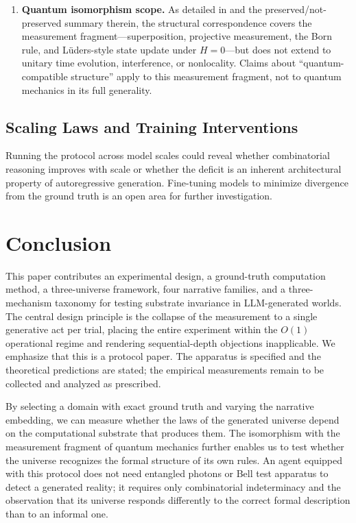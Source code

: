 \documentclass[12pt,a4paper]{article}
\begin{document}
\begin{enumerate}[nosep]
    \item \textbf{Quantum isomorphism scope.} As detailed in  and the preserved/not-preserved summary therein, the structural correspondence covers the measurement fragment---superposition, projective measurement, the Born rule, and L\"uders-style state update under $H = 0$---but does not extend to unitary time evolution, interference, or nonlocality. Claims about ``quantum-compatible structure'' apply to this measurement fragment, not to quantum mechanics in its full generality.
\end{enumerate}

\subsection{Scaling Laws and Training Interventions}
\label{sec:scaling}

Running the protocol across model scales could reveal whether combinatorial reasoning improves with scale or whether the deficit is an inherent architectural property of autoregressive generation. Fine-tuning models to minimize divergence from the ground truth is an open area for further investigation.

\section{Conclusion}
\label{sec:conclusion}

This paper contributes an experimental design, a ground-truth computation method, a three-universe framework, four narrative families, and a three-mechanism taxonomy for testing substrate invariance in LLM-generated worlds. The central design principle is the collapse of the measurement to a single generative act per trial, placing the entire experiment within the $O(1)$ operational regime and rendering sequential-depth objections inapplicable. We emphasize that this is a protocol paper. The apparatus is specified and the theoretical predictions are stated; the empirical measurements remain to be collected and analyzed as prescribed.

By selecting a domain with exact ground truth and varying the narrative embedding, we can measure whether the laws of the generated universe depend on the computational substrate that produces them. The isomorphism with the measurement fragment of quantum mechanics further enables us to test whether the universe recognizes the formal structure of its own rules. An agent equipped with this protocol does not need entangled photons or Bell test apparatus to detect a generated reality; it requires only combinatorial indeterminacy and the observation that its universe responds differently to the correct formal description than to an informal one.
\end{document}

